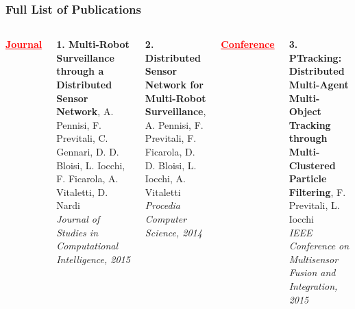\logo
{
	\vspace{199.1pt}
}

\begin{frame}
	\frametitle{Full List of Publications}
	
	\vspace{-0.2cm}
	
	\begin{columns}[t]
		
		\tiny
		
		\textcolor{red}{\textbf{\underline{Journal}}}
		
		\vspace{0.1cm}
		
		\textbf{1. Multi-Robot Surveillance through a Distributed Sensor Network}, A. Pennisi, F.
		Previtali, C. Gennari, D. D. Bloisi, L. Iocchi, F. Ficarola, A. Vitaletti, D. Nardi \\
		\emph{Journal of Studies in Computational Intelligence, 2015}
		
		\vspace{0.15cm}
		
		\textbf{2. Distributed Sensor Network for Multi-Robot Surveillance}, A. Pennisi, F. Previtali,
		F. Ficarola, D. D. Bloisi, L. Iocchi, A. Vitaletti \\
		\emph{Procedia Computer Science, 2014}
		
		\vspace{0.2cm}
		
		\textcolor{red}{\textbf{\underline{Conference}}}
		
		\vspace{0.1cm}
		
		\textbf{3. PTracking: Distributed Multi-Agent Multi-Object Tracking through Multi-Clustered
		Particle Filtering}, F. Previtali, L. Iocchi \\
		\emph{IEEE Conference on Multisensor Fusion and Integration, 2015}
		

\end{columns}
\end{frame}

